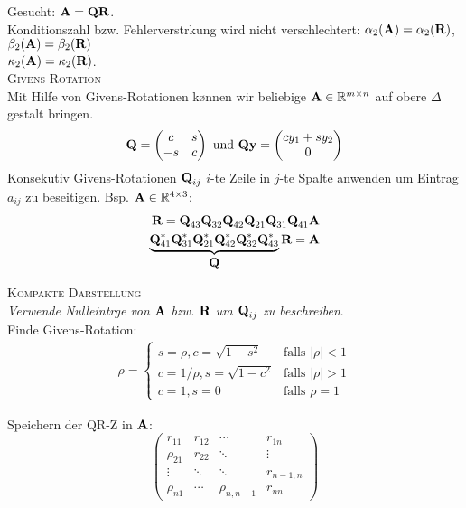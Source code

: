 Gesucht: $\mbox{\bf A}=\mbox{\bf QR}$.\\
Konditionszahl bzw. Fehlerverst\a rkung wird nicht verschlechtert: $\alpha_2(\mbox{\bf A}) = \alpha_2(\mbox{\bf R})$, $\beta_2(\mbox{\bf A}) = \beta_2(\mbox{\bf R})$\\
$\kappa_2(\mbox{\bf A})= \kappa_2(\mbox{\bf R})$.\\

\textsc{Givens-Rotation}\\
Mit Hilfe von Givens-Rotationen k\o nnen wir beliebige $\mbox{\bf A}\in \mathbb{R}^{m \times n}$ auf obere $\Delta$gestalt bringen.
\begin{align*}
\mbox{\bf Q}=\begin{pmatrix}
c & s \\
-s & c
\end{pmatrix}
\text{ und }
\mbox{\bf Qy} = \begin{pmatrix}
cy_1 + sy_2 \\ 0
\end{pmatrix}
\end{align*}
Konsekutiv Givens-Rotationen $\mbox{\bf Q}_{ij}$ $i$-te Zeile in $j$-te Spalte anwenden um Eintrag $a_{ij}$ zu beseitigen. Bsp. $\mbox{\bf A} \in \mathbb{R}^{4 \times 3}$:
\begin{align*}
\mbox{\bf R} = \mbox{\bf Q}_{43}\mbox{\bf Q}_{32}\mbox{\bf Q}_{42}\mbox{\bf Q}_{21}\mbox{\bf Q}_{31}\mbox{\bf Q}_{41}\mbox{\bf A} \\
\underbrace{\mbox{\bf Q}_{41}^*\mbox{\bf Q}_{31}^*\mbox{\bf Q}_{21}^*\mbox{\bf Q}_{42}^*\mbox{\bf Q}_{32}^*\mbox{\bf Q}_{43}^*}_{\mbox{\bf Q}}\mbox{\bf R}=\mbox{\bf A}
\end{align*}

\textsc{Kompakte Darstellung}\\
\emph{Verwende Nulleintr\a ge von $\mbox{\bf A}$ bzw. $\mbox{\bf R}$ um $\mbox{\bf Q}_{ij}$ zu beschreiben}.\\
Finde Givens-Rotation:
\begin{align*}
\rho = 
\begin{cases}
s = \rho, c=\sqrt{1-s^2}  &\text{falls $|\rho|<1$} \\
c = 1/\rho, s=\sqrt{1-c^2} &\text{falls $|\rho|>1$} \\
c = 1, s=0 &\text{falls $\rho=1$}
\end{cases}
\end{align*}

Speichern der QR-Z in $\mbox{\bf A}$:
\begin{equation}
\begin{pmatrix}
r_{11} & r_{12} & \cdots    & r_{1n} \\
\rho_{21} & r_{22} & \ddots    & \vdots \\
\vdots & \ddots & \ddots    & r_{n-1,n} \\
\rho_{n1} & \cdots & \rho_{n,n-1} & r_{nn} 
\end{pmatrix}
\end{equation}

